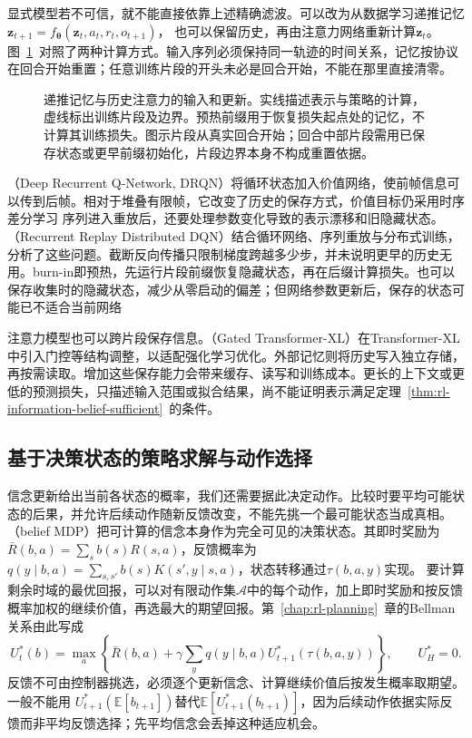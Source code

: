 显式模型若不可信，就不能直接依靠上述精确滤波。可以改为从数据学习递推记忆
$\bm z_{t+1}=f_{\bm\theta}(\bm z_t,a_t,r_t,o_{t+1})$，
也可以保留历史，再由注意力网络重新计算$\bm z_t$。图~\ref{fig:rl-information-memory}~对照了两种计算方式。输入序列必须保持同一轨迹的时间关系，记忆按协议在回合开始重置；任意训练片段的开头未必是回合开始，不能在那里直接清零。

\begin{figure}[htbp]
  \centering
  
  \caption{递推记忆与历史注意力的输入和更新。实线描述表示与策略的计算，虚线标出训练片段及边界。预热前缀用于恢复损失起点处的记忆，不计算其训练损失。图示片段从真实回合开始；回合中部片段需用已保存状态或更早前缀初始化，片段边界本身不构成重置依据。}
  \label{fig:rl-information-memory}
\end{figure}

（Deep Recurrent Q-Network, DRQN）将循环状态加入价值网络，使前帧信息可以传到后帧。相对于堆叠有限帧，它改变了历史的保存方式，价值目标仍采用时序差分学习
序列进入重放后，还要处理参数变化导致的表示漂移和旧隐藏状态。（Recurrent Replay Distributed DQN）结合循环网络、序列重放与分布式训练，分析了这些问题。截断反向传播只限制梯度跨越多少步，并未说明更早的历史无用。burn-in即预热，先运行片段前缀恢复隐藏状态，再在后缀计算损失。也可以保存收集时的隐藏状态，减少从零启动的偏差；但网络参数更新后，保存的状态可能已不适合当前网络

注意力模型也可以跨片段保存信息。（Gated Transformer-XL）在Transformer-XL中引入门控等结构调整，以适配强化学习优化。外部记忆则将历史写入独立存储，再按需读取。增加这些保存能力会带来缓存、读写和训练成本。更长的上下文或更低的预测损失，只描述输入范围或拟合结果，尚不能证明表示满足定理~\ref{thm:rl-information-belief-sufficient}~的条件。

\subsection{基于决策状态的策略求解与动作选择}
\label{sec:rl-information-belief-control}

信念更新给出当前各状态的概率，我们还需要据此决定动作。比较时要平均可能状态的后果，并允许后续动作随新反馈改变，不能先挑一个最可能状态当成真相。（belief MDP）把可计算的信念本身作为完全可见的决策状态。其即时奖励为
$\bar R(b,a)=\sum_s b(s)R(s,a)$，反馈概率为
$q(y\mid b,a)=\sum_{s,s'}b(s)K(s',y\mid s,a)$，状态转移通过$\tau(b,a,y)$实现。
要计算剩余时域的最优回报，可以对有限动作集$\mathcal A$中的每个动作，加上即时奖励和按反馈概率加权的继续价值，再选最大的期望回报。第~\ref{chap:rl-planning}~章的Bellman关系由此写成
\begin{equation}
  \label{eq:rl-information-belief-bellman}
  U_t^*(b)=\max_a\left\{
    \bar R(b,a)+\gamma\sum_yq(y\mid b,a)
                    U_{t+1}^*(\tau(b,a,y))\right\},
  \qquad U_H^*=0.
\end{equation}
反馈不可由控制器挑选，必须逐个更新信念、计算继续价值后按发生概率取期望。一般不能用
$U_{t+1}^*(\mathbb E[b_{t+1}])$替代$\mathbb E[U_{t+1}^*(b_{t+1})]$，因为后续动作依据实际反馈而非平均反馈选择；先平均信念会丢掉这种适应机会。

